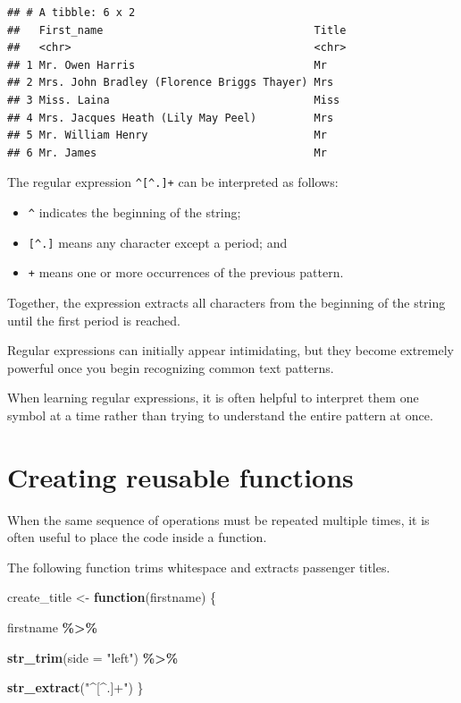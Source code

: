 \documentclass[
  11pt,
  oneside]{book}
\newenvironment{Shaded}{\begin{snugshade}}{\end{snugshade}}
\newcommand{\AttributeTok}[1]{\textcolor[rgb]{0.13,0.29,0.53}{#1}}
\newcommand{\ControlFlowTok}[1]{\textcolor[rgb]{0.13,0.29,0.53}{\textbf{#1}}}
\newcommand{\FunctionTok}[1]{\textcolor[rgb]{0.13,0.29,0.53}{\textbf{#1}}}
\newcommand{\NormalTok}[1]{#1}
\newcommand{\OtherTok}[1]{\textcolor[rgb]{0.56,0.35,0.01}{#1}}
\newcommand{\SpecialCharTok}[1]{\textcolor[rgb]{0.81,0.36,0.00}{\textbf{#1}}}
\newcommand{\StringTok}[1]{\textcolor[rgb]{0.31,0.60,0.02}{#1}}
\providecommand{\tightlist}{%
  \setlength{\itemsep}{0pt}\setlength{\parskip}{0pt}}
\begin{document}
\begin{verbatim}
## # A tibble: 6 x 2
##   First_name                                 Title
##   <chr>                                      <chr>
## 1 Mr. Owen Harris                            Mr   
## 2 Mrs. John Bradley (Florence Briggs Thayer) Mrs  
## 3 Miss. Laina                                Miss 
## 4 Mrs. Jacques Heath (Lily May Peel)         Mrs  
## 5 Mr. William Henry                          Mr   
## 6 Mr. James                                  Mr
\end{verbatim}

The regular expression \texttt{\^{}{[}\^{}.{]}+} can be interpreted as follows:

\begin{itemize}
\tightlist
\item
  \texttt{\^{}} indicates the beginning of the string;
\item
  \texttt{{[}\^{}.{]}} means any character except a period; and
\item
  \texttt{+} means one or more occurrences of the previous pattern.
\end{itemize}

Together, the expression extracts all characters from the beginning of the string until the first period is reached.

Regular expressions can initially appear intimidating, but they become extremely powerful once you begin recognizing common text patterns.

When learning regular expressions, it is often helpful to interpret them one symbol at a time rather than trying to understand the entire pattern at once.

\section{Creating reusable functions}\label{creating-reusable-functions}

When the same sequence of operations must be repeated multiple times, it is often useful to place the code inside a function.

The following function trims whitespace and extracts passenger titles.

\begin{Shaded}
\begin{Highlighting}[]
\NormalTok{create\_title }\OtherTok{\textless{}{-}} \ControlFlowTok{function}\NormalTok{(firstname) \{}
  
\NormalTok{  firstname }\SpecialCharTok{\%\textgreater{}\%}
    
    \FunctionTok{str\_trim}\NormalTok{(}\AttributeTok{side =} \StringTok{"left"}\NormalTok{) }\SpecialCharTok{\%\textgreater{}\%}
    
    \FunctionTok{str\_extract}\NormalTok{(}\StringTok{"\^{}[\^{}.]+"}\NormalTok{)}
\NormalTok{\}}
\end{Highlighting}
\end{Shaded}
\end{document}
